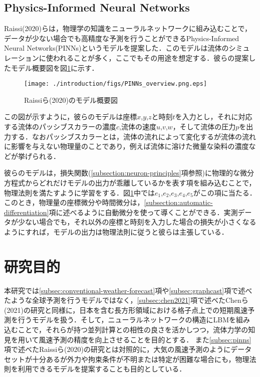 \subsection{Physics-Informed Neural Networks \label{subsec:pinns}}
Raissi(2020)らは，物理学の知識をニューラルネットワークに組み込むことで，データが少ない場合でも高精度な予測を行うことができるPhysics-Informed Neural Networks(PINNs)というモデルを提案した\cite{PINNs2020}．このモデルは流体のシミュレーションに使われることが多く\cite{app13126892}，ここでもその用途を想定する．彼らの提案したモデル概要図を図\ref{fig:pinns-overview}に示す．
\begin{figure}[bp]
    \centering
    \texttt{[image: ./introduction/figs/PINNs\_overview.png.eps]}
    \caption{Raissiら(2020)のモデル概要図\cite{PINNs2020}}
    \label{fig:pinns-overview}
\end{figure}
この図が示すように，彼らのモデルは座標$x$,$y$,$z$と時刻$t$を入力とし，それに対応する流体のパッシブスカラーの濃度$c$,流体の速度$u$,$v$,$w$，そして流体の圧力$p$を出力する．なおパッシブスカラーとは，流体の流れによって変化するが流体の流れに影響を与えない物理量のことであり，例えば流体に溶けた微量な染料の濃度などが挙げられる\cite{Lesieur1990}．

彼らのモデルは，損失関数(\ref{subsection:neuron-principles}項参照)に物理的な微分方程式からどれだけモデルの出力が乖離しているかを表す項を組み込むことで，物理法則を満たすように学習をする．図\ref{fig:pinns-overview}中では$e_1$,$e_2$,$e_3$,$e_4$,$e_5$がこの項に当たる．このとき，物理量の座標微分や時間微分は，\ref{subsection:automatic-differentiation}項に述べるように自動微分を使って導くことができる．実測データが少ない場合でも，それ以外の座標と時刻を入力した場合の損失が小さくなるようにすれば，モデルの出力は物理法則に従うと彼らは主張している．





\section{研究目的}
本研究では\ref{subsec:conventional-weather-forecast}項や\ref{subsec:graphcast}項で述べたような全球予測を行うモデルではなく，\ref{subsec:chen2021}項で述べたChenら(2021)の研究と同様に，日本を含む長方形領域における格子点上での短期風速予測を行うモデルを扱う．そして，ニューラルネットワークの構造にLBMを組み込むことで，それらが持つ並列計算との相性の良さを活かしつつ，流体力学の知見を用いて風速予測の精度を向上させることを目的とする．
また\ref{subsec:pinns}項で述べたRaissiら(2020)の研究とは対照的に，大気の風速予測のようにデータセットが十分あるが外力や拘束条件が不明または特定が困難な場合にも，物理法則を利用できるモデルを提案することも目的としている．

